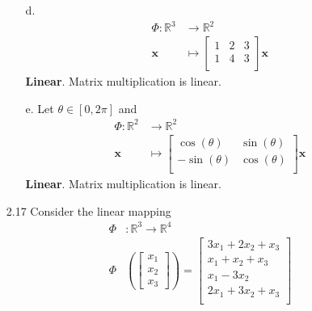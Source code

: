 \documentclass[11pt]{article}
\newcommand{\R}{\mathbb{R}}
\newcommand{\vect}[1]{\bm{#1}}      %
\newcommand{\args}[1]{\!\left(#1\right)}                 %
\theoremstyle{definition}
\theoremstyle{plain}
\theoremstyle{remark}
\begin{document}
\begin{enumerate}
\begin{enumerate}
              \item[d.]
                    \[
                        \begin{aligned}
                            \Phi : \R^3 & \rightarrow \R^2 \\
                            \vect{x}    & \mapsto
                            \begin{bmatrix}
                                1 & 2 & 3 \\
                                1 & 4 & 3 \\
                            \end{bmatrix}
                            \vect{x}
                        \end{aligned}
                    \]
                    \textbf{Linear}. Matrix multiplication is linear.

              \item[e.] Let $\theta \in [0, 2\pi]$ and
                    \[
                        \begin{aligned}
                            \Phi : \R^2 & \rightarrow \R^2 \\
                            \vect{x}    & \mapsto
                            \begin{bmatrix}
                                \cos(\theta)  & \sin(\theta) \\
                                -\sin(\theta) & \cos(\theta) \\
                            \end{bmatrix}
                            \vect{x}
                        \end{aligned}
                    \]
                    \textbf{Linear}. Matrix multiplication is linear.

          \end{enumerate}

          \pagebreak

    \item[2.17] Consider the linear mapping
          \[
              \begin{aligned}
                  \Phi & : \R^3 \rightarrow \R^4 \\
                  \Phi & \args{
                      \begin{bmatrix}
                          x_1 \\ x_2 \\ x_3
                      \end{bmatrix}
                  }
                  = \begin{bmatrix}
                        3x_1 + 2x_2 + x_3 \\
                        x_1 + x_2 + x_3   \\
                        x_1 - 3 x_2       \\
                        2x_1 + 3x_2 + x_3 \\
                    \end{bmatrix}
              \end{aligned}
          \]


\end{enumerate}
\end{document}
